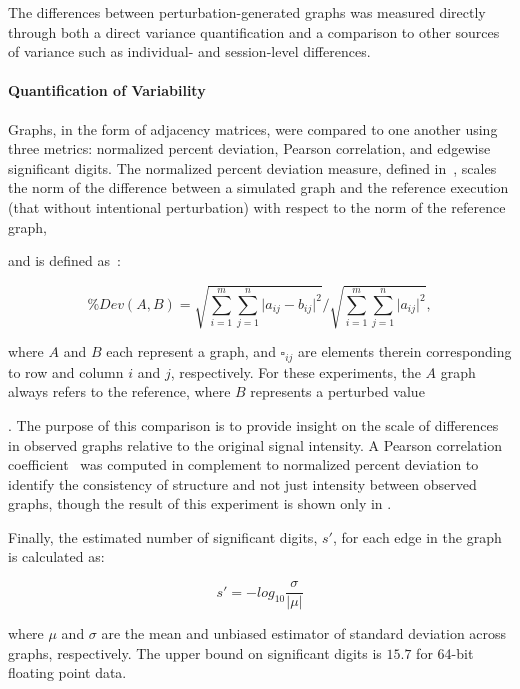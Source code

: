\documentclass[fleqn,10pt]{SelfArx} %
\newcommand{\new}[1]{{#1}}
\begin{document}
The differences between \new{perturbation-generated} graphs was measured directly through both a direct variance quantification and a
comparison to other sources of variance such as individual- and session-level differences.

\paragraph{Quantification of Variability}
Graphs, in the form of adjacency matrices, were compared to one another using three metrics: normalized percent
deviation, Pearson correlation, and edgewise significant digits. The normalized percent deviation measure, defined
in~\cite{Kiar2020-lb}, scales the norm of the difference between a simulated graph and the reference execution (that
without intentional perturbation) with respect to the norm of the reference graph, \new{and is defined as~\cite{Kiar2020-lb}:

\begin{equation}
\% Dev (A, B) = \sqrt{\sum_{i=1}^m\sum_{j=1}^n \lvert a_{ij} - b_{ij} \rvert^2 } / \sqrt{\sum_{i=1}^m\sum_{j=1}^n \lvert a_{ij} \rvert^2},
\label{eq:eval}
\end{equation}

where $A$ and $B$ each represent a graph, and $\square_{ij}$ are elements therein corresponding to row and column
$i$ and $j$, respectively. For these experiments, the $A$ graph always refers to the reference, where $B$ represents a
perturbed value}. The purpose of this comparison is
to provide insight on the scale of differences in observed graphs relative to the original signal intensity. A Pearson
correlation coefficient~\cite{Benesty2009-cb} was computed in complement to normalized percent deviation to identify
the consistency of structure and not just intensity between observed graphs, \new{though the result of this experiment
is shown only in \sref{supsec:correlation}}.

Finally, the estimated number of significant digits, $s'$, for each edge in the graph is calculated as:

\begin{equation}
s' = -log_{10}\frac{\sigma}{\lvert\mu\rvert}
\label{eq:sigdig}
\end{equation}

where $\mu$ and $\sigma$ are the mean and unbiased estimator of standard deviation across graphs, respectively. The
upper bound on significant digits is $15.7$ for 64-bit floating point data.
\end{document}
